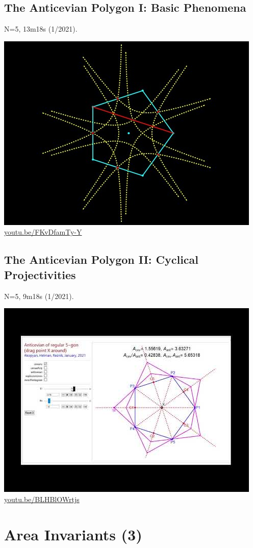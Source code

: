 \documentclass[12pt]{amsart}
\begin{document}
\subsection{The Anticevian Polygon I: Basic Phenomena}
\label{vid:FKvDfamTy-Y}
\noindent N=5, 13m18s (1/2021). 
\begin{center}\includegraphics[width=.5\textwidth]{pics/FKvDfamTy-Y.jpg} \\ 
\href{https://youtu.be/FKvDfamTy-Y}{\url{youtu.be/FKvDfamTy-Y}}\end{center}
% 

\subsection{The Anticevian Polygon II: Cyclical Projectivities}
\label{vid:BLHBlOWrtjs}
\noindent N=5, 9m18s (1/2021). 
\begin{center}\includegraphics[width=.5\textwidth]{pics/BLHBlOWrtjs.jpg} \\ 
\href{https://youtu.be/BLHBlOWrtjs}{\url{youtu.be/BLHBlOWrtjs}}\end{center}
% 


\section{Area Invariants (3)}
\end{document}

